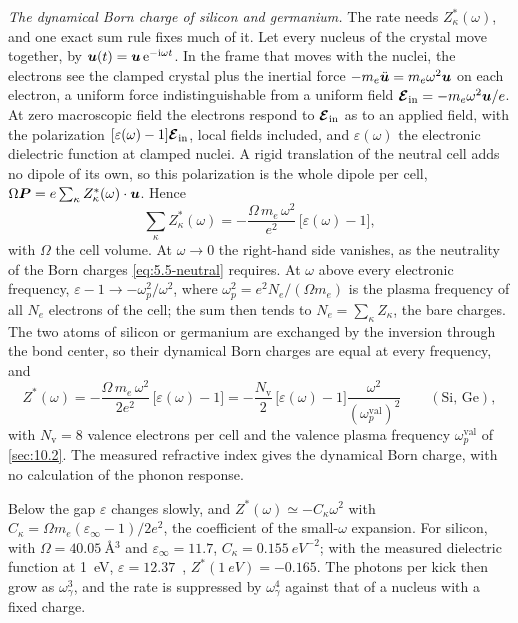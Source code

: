\emph{The dynamical Born charge of silicon and germanium.} The rate needs $Z^*_\kappa(\omega)$, and one exact sum rule fixes much of it. Let every nucleus of the crystal move together, by $\bm{u}(t) = \bm{u}\,\mathrm{e}^{-\mathrm{i}\omega t}$. In the frame that moves with the nuclei, the electrons see the clamped crystal plus the inertial force $-m_e\ddot{\bm{u}} = m_e\omega^2\bm{u}$ on each electron, a uniform force indistinguishable from a uniform field $\bm{\mathcal{E}}_{\mathrm{in}} = -m_e\omega^2\bm{u}/e$. At zero macroscopic field the electrons respond to $\bm{\mathcal{E}}_{\mathrm{in}}$ as to an applied field, with the polarization $[\varepsilon(\omega) - 1]\bm{\mathcal{E}}_{\mathrm{in}}$, local fields included, and $\varepsilon(\omega)$ the electronic dielectric function at clamped nuclei. A rigid translation of the neutral cell adds no dipole of its own, so this polarization is the whole dipole per cell, $\Omega\bm{P} = e\sum_\kappa Z^*_\kappa(\omega)\cdot\bm{u}$. Hence
\begin{equation}
  \sum_\kappa Z^*_\kappa(\omega) = -\frac{\Omega\,m_e\,\omega^2}{e^2}\,\bigl[\varepsilon(\omega) - 1\bigr] ,
  \label{eq:12.6-sum}
\end{equation}
with $\Omega$ the cell volume. At $\omega \to 0$ the right-hand side vanishes, as the neutrality of the Born charges \cref{eq:5.5-neutral} requires. At $\omega$ above every electronic frequency, $\varepsilon - 1 \to -\omega_p^2/\omega^2$, where $\omega_p^2 = e^2N_e/(\Omega m_e)$ is the plasma frequency of all $N_e$ electrons of the cell; the sum then tends to $N_e = \sum_\kappa Z_\kappa$, the bare charges. The two atoms of silicon or germanium are exchanged by the inversion through the bond center, so their dynamical Born charges are equal at every frequency, and
\begin{equation}
  Z^*(\omega) = -\frac{\Omega\,m_e\,\omega^2}{2e^2}\,\bigl[\varepsilon(\omega) - 1\bigr]
  = -\frac{N_{\mathrm{v}}}{2}\,\bigl[\varepsilon(\omega) - 1\bigr]\frac{\omega^2}{(\omega_p^{\mathrm{val}})^2}
  \qquad (\text{Si, Ge}) ,
  \label{eq:12.6-ZSi}
\end{equation}
with $N_{\mathrm{v}} = 8$ valence electrons per cell and the valence plasma frequency $\omega_p^{\mathrm{val}}$ of \cref{sec:10.2}. The measured refractive index gives the dynamical Born charge, with no calculation of the phonon response.

Below the gap $\varepsilon$ changes slowly, and $Z^*(\omega) \simeq -C_\kappa\omega^2$ with $C_\kappa = \Omega m_e(\varepsilon_\infty - 1)/2e^2$, the coefficient of the small-$\omega$ expansion. For silicon, with $\Omega = \SI{40.05}{\angstrom^3}$ and $\varepsilon_\infty = 11.7$, $C_\kappa = \SI{0.155}{eV^{-2}}$; with the measured dielectric function at \SI{1}{eV}, $\varepsilon = 12.37$~\cite{franta2017temperature}, $Z^*(\SI{1}{eV}) = -0.165$. The photons per kick then grow as $\omega_\gamma^3$, and the rate is suppressed by $\omega_\gamma^4$ against that of a nucleus with a fixed charge.

